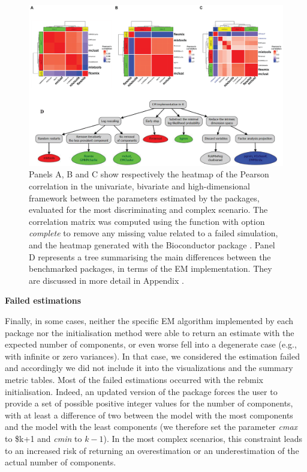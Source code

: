 \begin{figure}

{\centering \includegraphics[width=1\linewidth]{./figs/dichotomy_package_conclusion} 

}

\caption{Panels A, B and C show respectively the heatmap of the Pearson correlation in the univariate, bivariate and high-dimensional framework between the parameters estimated by the packages, evaluated for the most discriminating and complex scenario. The correlation matrix was computed using the function  with option \textit{complete} to remove any missing value related to a failed simulation, and the heatmap generated with the Bioconductor package . Panel D represents a tree summarising the main differences between the benchmarked packages, in terms of the EM implementation. They are discussed in more detail in Appendix .}\label{fig:dichotomy-package-conclusion}
\end{figure}

\textbf{Failed estimations}

Finally, in some cases, neither the specific EM algorithm implemented by each package nor the initialisation method were able to return an estimate with the expected number of components, or even worse fell into a degenerate case (e.g., with infinite or zero variances). In that case, we considered the estimation failed and accordingly we did not include it into the visualizations and the summary metric tables. Most of the failed estimations occurred with the rebmix initialisation. Indeed, an updated version of the package forces the user to provide a set of possible positive integer values for the number of components, with at least a difference of two between the model with the most components and the model with the least components (we therefore set the parameter \emph{cmax} to \$k+1 and \emph{cmin} to \(k-1\)). In the most complex scenarios, this constraint leads to an increased risk of returning an overestimation or an underestimation of the actual number of components.

